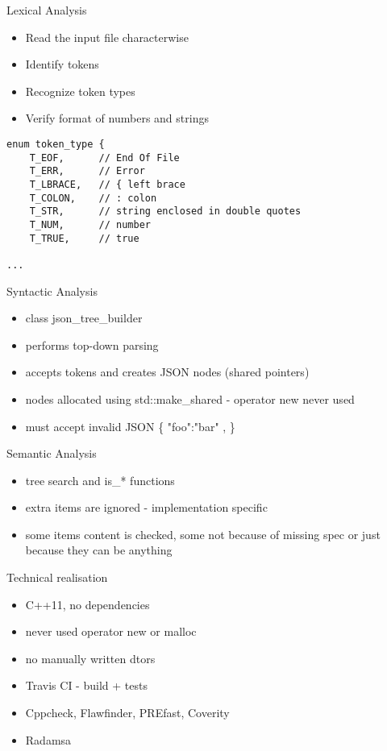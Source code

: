 \documentclass{beamer}
\begin{document}
\begin{frame}[fragile]{Lexical Analysis}

\begin{itemize}
    \item Read the input file characterwise
    \item Identify tokens
    \item Recognize token types
    \item Verify format of numbers and strings
\end{itemize}

\begin{Verbatim}[fontsize=\small]
enum token_type {
    T_EOF,      // End Of File
    T_ERR,      // Error
    T_LBRACE,   // { left brace
    T_COLON,    // : colon
    T_STR,      // string enclosed in double quotes
    T_NUM,      // number
    T_TRUE,     // true

...
\end{Verbatim}
\end{frame}

\begin{frame}{Syntactic Analysis}
\begin{itemize}
    \item class json\_tree\_builder
    \item performs top-down parsing
    \item accepts tokens and creates JSON nodes (shared pointers)
    \item nodes allocated using std::make\_shared - operator new never used
    \item must accept invalid JSON \{ "foo":"bar" , \}
\end{itemize}
\end{frame}

\begin{frame}{Semantic Analysis}
\begin{itemize}
	\item tree search and is\_* functions
	\item extra items are ignored - implementation specific
	\item some items content is checked, some not because of missing spec or just because they can be anything
\end{itemize}
\end{frame}

\begin{frame}{Technical realisation}
\begin{itemize}
    \item C++11, no dependencies
    \item never used operator new or malloc
    \item no manually written dtors
    \item Travis CI - build + tests
    \item Cppcheck, Flawfinder, PREfast, Coverity
    \item Radamsa
\end{itemize}
\end{frame}
\end{document}

